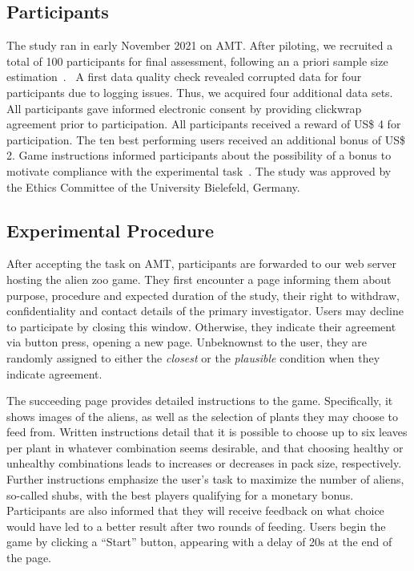 \subsection{Participants}

The study ran in early November 2021 on \gls{AMT}.
After piloting, we recruited a total of 100 participants for final assessment, following an a priori sample size estimation~\citep{kumle_estimating_2021}.%
~A first data quality check revealed corrupted data for four participants due to logging issues. 
Thus, we acquired four additional data sets. 
All participants gave informed electronic consent by providing clickwrap agreement prior to participation.
All participants received a reward of US\$ 4 for participation. 
The ten best performing users received an additional bonus of US\$ 2. 
Game instructions informed participants about the possibility of a bonus to motivate compliance with the experimental task~\citep{bansal_updates_2019}.
The study was approved by the Ethics Committee of the University Bielefeld, Germany.

\subsection{Experimental Procedure}\label{subsec:experimental-procedure}

After accepting the task on \gls{AMT}, participants are forwarded to our web server hosting the alien zoo game.
They first encounter a page informing them about purpose, procedure and expected duration of the study, their right to withdraw, confidentiality and contact details of the primary investigator.
Users may decline to participate by closing this window.
Otherwise, they indicate their agreement via button press, opening a new page.
Unbeknownst to the user, they are randomly assigned to either the \textit{closest} or the \textit{plausible} condition when they indicate agreement.

The succeeding page provides detailed instructions to the game. 
Specifically, it shows images of the aliens, as well as the selection of plants they may choose to feed from.
Written instructions detail that it is possible to choose up to six leaves per plant in whatever combination seems desirable, and that choosing healthy or unhealthy combinations leads to increases or decreases in pack size, respectively.
Further instructions emphasize the user's task to maximize the number of aliens, so-called shubs, with the best players qualifying for a monetary bonus.
Participants are also informed that they will receive feedback on what choice would have led to a better result after two rounds of feeding.
Users begin the game by clicking a ``Start'' button, appearing with a delay of 20s at the end of the page. 

